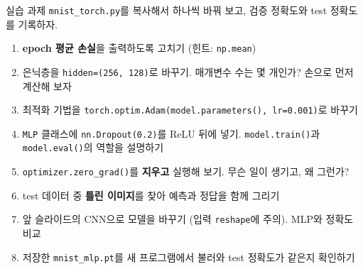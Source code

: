 \documentclass[aspectratio=169,11pt]{beamer}
\newcommand{\code}[1]{\texttt{#1}}
\begin{document}
\begin{frame}{실습 과제}
\small
\code{mnist\_torch.py}를 복사해서 하나씩 바꿔 보고, 검증 정확도와 test 정확도를 기록하자.
\begin{enumerate}
\item \textbf{epoch 평균 손실}을 출력하도록 고치기 (힌트: \code{np.mean})
\item 은닉층을 \code{hidden=(256, 128)}로 바꾸기. 매개변수 수는 몇 개인가? 손으로 먼저 계산해 보자
\item 최적화 기법을 \code{torch.optim.Adam(model.parameters(), lr=0.001)}로 바꾸기
\item \code{MLP} 클래스에 \code{nn.Dropout(0.2)}를 ReLU 뒤에 넣기. \code{model.train()}과 \code{model.eval()}의 역할을 설명하기
\item \code{optimizer.zero\_grad()}를 \textbf{지우고} 실행해 보기. 무슨 일이 생기고, 왜 그런가?
\item test 데이터 중 \textbf{틀린 이미지}를 찾아 예측과 정답을 함께 그리기
\item 앞 슬라이드의 CNN으로 모델을 바꾸기 (입력 \code{reshape}에 주의). MLP와 정확도 비교
\item 저장한 \code{mnist\_mlp.pt}를 새 프로그램에서 불러와 test 정확도가 같은지 확인하기
\end{enumerate}
\end{frame}
\end{document}
